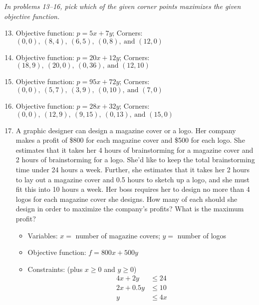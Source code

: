 \emph{In problems 13--16, pick which of the given corner points maximizes the given objective function.}
\begin{enumerate}
\setcounter{enumi}{12}

\item Objective function: $p=5x+7y$; Corners: $(0,0),\ (8,4),\ (6,5),\ (0,8),\ \textrm{and } (12,0)$ 

\item Objective function: $p=20x+12y$; Corners: $(18,9),\ (20,0),\ (0,36),\ \textrm{and } (12,10)$ 

\item Objective function: $p=95x+72y$; Corners: $(0,0),\ (5,7),\ (3,9),\ (0,10),\ \textrm{and } (7,0)$ 

\item Objective function: $p=28x+32y$; Corners: $(0,0),\ (12,9),\ (9,15),\ (0,13),\ \textrm{and } (15,0)$ 

\item A graphic designer can design a magazine cover or a logo.  Her company makes a profit of \$800 for each magazine cover and \$500 for each logo.  She estimates that it takes her 4 hours of brainstorming for a magazine cover and 2 hours of brainstorming for a logo.  She'd like to keep the total brainstorming time under 24 hours a week.  Further, she estimates that it takes her 2 hours to lay out a magazine cover and 0.5 hours to sketch up a logo, and she must fit this into 10 hours a week.  Her boss requires her to design no more than 4 logos for each magazine cover she designs.  How many of each should she design in order to maximize the company's profits?  What is the maximum profit?
\begin{itemize}
\item Variables: $x=$ number of magazine covers; $y=$ number of logos
\item Objective function: $f = 800x + 500y$
\item Constraints: (plus $x \geq 0$ and $y \geq 0$)
\begin{align*}
4x + 2y &\leq 24\\
2x + 0.5y &\leq 10\\
y &\leq 4x
\end{align*}


\end{itemize}
\end{enumerate}
